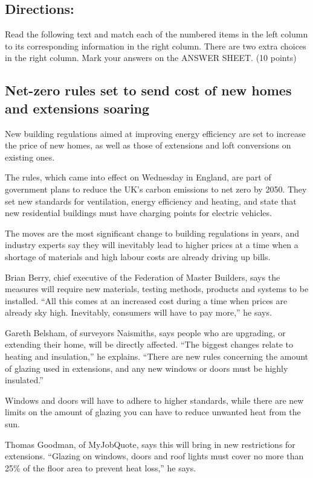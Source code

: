 \documentclass[UTF8,11pt]{ctexart}
\begin{document}
\subsection*{\textbf{Directions:}}


Read the following text and match each of the numbered items in the left column to its corresponding information in the right column. There are two extra choices in the right column. Mark your answers on the ANSWER SHEET. (10 points)


\subsection*{\textbf{Net-zero rules set to send cost of new homes and extensions soaring}}


New building regulations aimed at improving energy efficiency are set to increase the price of new homes, as well as those of extensions and loft conversions on existing ones.


The rules, which came into effect on Wednesday in England, are part of government plans to reduce the UK’s carbon emissions to net zero by 2050. They set new standards for ventilation, energy efficiency and heating, and state that new residential buildings must have charging points for electric vehicles.


The moves are the most significant change to building regulations in years, and industry experts say they will inevitably lead to higher prices at a time when a shortage of materials and high labour costs are already driving up bills.


Brian Berry, chief executive of the Federation of Master Builders, says the measures will require new materials, testing methods, products and systems to be installed. “All this comes at an increased cost during a time when prices are already sky high. Inevitably, consumers will have to pay more,” he says.


Gareth Belsham, of surveyors Naismiths, says people who are upgrading, or extending their home, will be directly affected. “The biggest changes relate to heating and insulation,” he explains. “There are new rules concerning the amount of glazing used in extensions, and any new windows or doors must be highly insulated.”


Windows and doors will have to adhere to higher standards, while there are new limits on the amount of glazing you can have to reduce unwanted heat from the sun.


Thomas Goodman, of MyJobQuote, says this will bring in new restrictions for extensions. “Glazing on windows, doors and roof lights must cover no more than 25\% of the floor area to prevent heat loss,” he says.
\end{document}
